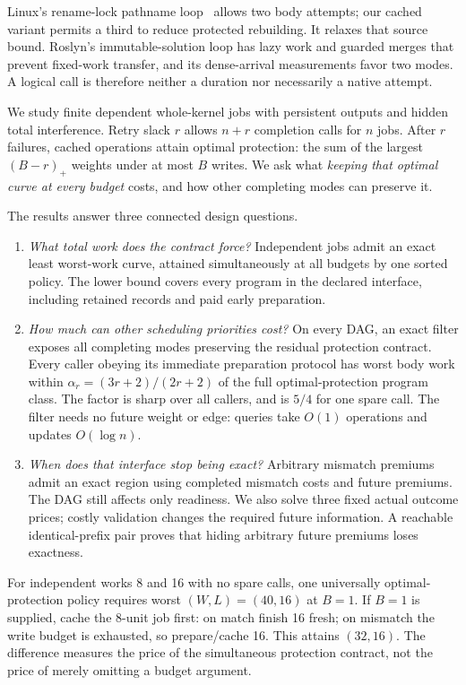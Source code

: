\documentclass[acmsmall,screen,review,anonymous]{acmart}
\begin{document}
Linux's rename-lock pathname loop~\cite{linuxDpath,linuxDcache} allows two body attempts; our cached variant permits a third to reduce protected rebuilding. It relaxes that source bound. Roslyn's immutable-solution loop has lazy work and guarded merges that prevent fixed-work transfer, and its dense-arrival measurements favor two modes. A logical call is therefore neither a duration nor necessarily a native attempt.

We study finite dependent whole-kernel jobs with persistent outputs and hidden total interference. Retry slack $r$ allows $n+r$ completion calls for $n$ jobs. After $r$ failures, cached operations attain optimal protection: the sum of the largest $(B-r)_+$ weights under at most $B$ writes. We ask what \emph{keeping that optimal curve at every budget} costs, and how other completing modes can preserve it.

The results answer three connected design questions.
\begin{enumerate}
\setlength{\itemsep}{0pt}
\item \emph{What total work does the contract force?} Independent jobs admit an exact least worst-work curve, attained simultaneously at all budgets by one sorted policy. The lower bound covers every program in the declared interface, including retained records and paid early preparation.
\item \emph{How much can other scheduling priorities cost?} On every DAG, an exact filter exposes all completing modes preserving the residual protection contract. Every caller obeying its immediate preparation protocol has worst body work within $\alpha_r=(3r+2)/(2r+2)$ of the full optimal-protection program class. The factor is sharp over all callers, and is $5/4$ for one spare call. The filter needs no future weight or edge: queries take $O(1)$ operations and updates $O(\log n)$.
\item \emph{When does that interface stop being exact?} Arbitrary mismatch premiums admit an exact region using completed mismatch costs and future premiums. The DAG still affects only readiness. We also solve three fixed actual outcome prices; costly validation changes the required future information. A reachable identical-prefix pair proves that hiding arbitrary future premiums loses exactness.
\end{enumerate}

For independent works 8 and 16 with no spare calls, one universally optimal-protection policy requires worst $(W,L)=(40,16)$ at $B=1$. If $B=1$ is supplied, cache the 8-unit job first: on match finish 16 fresh; on mismatch the write budget is exhausted, so prepare/cache 16. This attains $(32,16)$. The difference measures the price of the simultaneous protection contract, not the price of merely omitting a budget argument.
\end{document}
